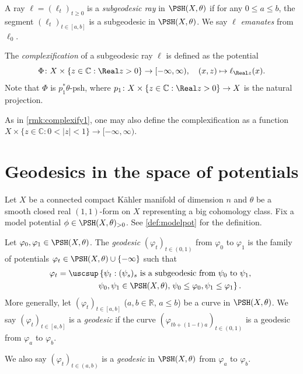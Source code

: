 \begin{definition}\label{def:subgeoray}
    A ray $\ell=(\ell_t)_{t\geq 0}$ is a \emph{subgeodesic ray} in $\PSH(X,\theta)$ if for any $0\leq a\leq b$, the segment $(\ell_{t})_{t\in [a,b]}$ is a subgeodesic in $\PSH(X,\theta)$. We say $\ell$ \emph{emanates} from $\ell_0$.

    The \emph{complexification} of a subgeodesic ray $\ell$ is defined as the potential
    \[
    \Phi\colon X\times \{z\in \mathbb{C}:\Real z>0\}\rightarrow [-\infty,\infty),\quad (x,z)\mapsto \ell_{\Real z}(x).
    \]
    Note that $\Phi$ is $p_1^*\theta$-psh, where $p_1\colon X\times \{z\in \mathbb{C}:\Real z>0\}\rightarrow X$ is the natural projection.
\end{definition}
\begin{remark}
    As in \cref{rmk:complexify1}, one may also define the complexification as a function $X\times \{z\in \mathbb{C}: 0<|z|<1\}\rightarrow [-\infty,\infty)$.
\end{remark}



\section{Geodesics in the space of potentials}\label{sec:relativeray}
Let $X$ be a connected compact Kähler manifold of dimension $n$ and $\theta$ be a smooth closed real $(1,1)$-form on $X$ representing a big cohomology class.
Fix a model potential $\phi\in \PSH(X,\theta)_{>0}$. See \cref{def:modelpot} for the definition.

\begin{definition}\label{def:geo}
    Let $\varphi_0, \varphi_1 \in \PSH(X,\theta)$. The \emph{geodesic} $(\varphi_t)_{t\in (0,1)}$ from $\varphi_0$ to $\varphi_1$ is the family of potentials $\varphi_t\in \PSH(X,\theta)\cup \{-\infty\}$ such that
    \begin{equation}\label{eq:Perron2}
        \begin{split}
        \varphi_t=\uscsup & \left\{  \psi_t: (\psi_{s})_s \textup{ is a subgeodesic from }\psi_0\textup{ to }\psi_1,\right.\\
        &\psi_0,\psi_1\in \PSH(X,\theta),\left.\psi_0\leq \varphi_0,\psi_1\leq \varphi_1\right\}.
        \end{split}
    \end{equation}
    More generally, let $(\varphi_t)_{t\in [a,b]}$ ($a,b\in \mathbb{R}$, $a\leq b$) be a curve in $\PSH(X,\theta)$. We say $(\varphi_t)_{t\in [a,b]}$ is a \emph{geodesic} if the curve $(\varphi_{tb+(1-t)a})_{t\in (0,1)}$ is a geodesic from $\varphi_a$ to $\varphi_b$.

    We also say $(\varphi_t)_{t\in (a,b)}$ is a \emph{geodesic} in $\PSH(X,\theta)$ from $\varphi_a$ to $\varphi_b$.
\end{definition}

